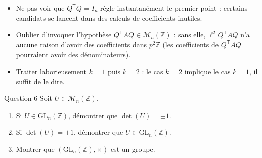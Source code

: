 \documentclass[11pt,a4paper]{article}
\newcommand{\Z}{\mathbb{Z}}
\newcommand{\Mn}[1][n]{\mathcal{M}_{#1}}
\newcommand{\GLn}[1][n]{\mathrm{GL}_{#1}}
\newcommand{\T}{\mathsf{T}}               %
\begin{document}
\begin{pieges}
\begin{itemize}[leftmargin=1.4em, itemsep=2pt]
\item Ne pas voir que $Q^{\T}Q=I_n$ règle instantanément le premier
point : certains candidats se lancent dans des calculs de
coefficients inutiles.
\item Oublier d'invoquer l'hypothèse $Q^{\T}AQ\in\Mn(\Z)$ : sans elle,
$\ell^{2}Q^{\T}AQ$ n'a aucune raison d'avoir des coefficients dans
$p^{2}\Z$ (les coefficients de $Q^{\T}AQ$ pourraient avoir des
dénominateurs).
\item Traiter laborieusement $k=1$ puis $k=2$ : le cas $k=2$ implique
le cas $k=1$, il suffit de le dire.
\end{itemize}
\end{pieges}

\begin{enonce}{Question 6}
Soit $U\in\Mn(\Z)$.
\begin{enumerate}
\item Si $U\in\GLn(\Z)$, démontrer que $\det(U)=\pm 1$.
\item Si $\det(U)=\pm 1$, démontrer que $U\in\GLn(\Z)$.
\item Montrer que $(\GLn(\Z),\times)$ est un groupe.
\end{enumerate}
\end{enonce}
\end{document}

